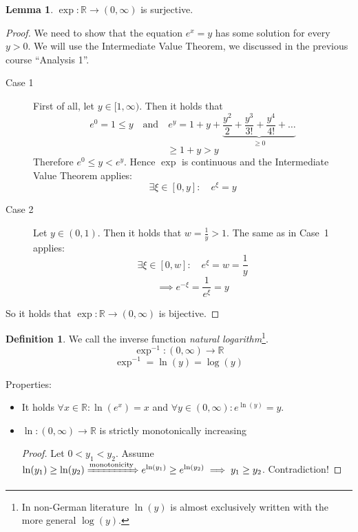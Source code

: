 \documentclass[a4paper,landscape,twocolumn]{article}
\theoremstyle{definition}
\newtheorem{defi}{Definition}
\newtheorem{lemma}{Lemma}
\begin{document}
\begin{lemma}
  $\exp: \mathbb R \to (0,\infty)$
  is surjective.
\end{lemma}
\begin{proof}
  We need to show that the equation $e^x = y$ has some solution for every $y > 0$.
  We will use the Intermediate Value Theorem, we discussed in the previous course \enquote{Analysis 1}.

  \begin{description}
    \item[Case 1]
      First of all, let $y \in [1,\infty)$. Then it holds that
      \[ e^0 = 1 \leq y \quad\text{and}\quad e^y = 1 + y + \underbrace{\frac{y^2}{2} + \frac{y^3}{3!} + \frac{y^4}{4!} + \ldots}_{\geq 0} \]
      \[ \geq 1 + y > y \]
      Therefore $e^0 \leq y < e^y$.
      Hence $\exp$ is continuous and the Intermediate Value Theorem applies:
      \[ \exists \xi \in [0,y]: \quad e^\xi = y \]
    \item[Case 2]
      Let $y \in (0,1)$. Then it holds that $w = \frac1{y} > 1$.
      The same as in Case~1 applies:
      \[ \exists \xi \in [0,w]: \quad e^\xi = w = \frac1{y} \]
      \[ \implies e^{-\xi} = \frac{1}{e^\xi} = y \]
  \end{description}

  So it holds that $\exp: \mathbb R \to (0,\infty)$ is bijective.
\end{proof}

\begin{defi}
  We call the inverse function \emph{natural logarithm}\footnote{In non-German literature $\ln(y)$ is almost exclusively written with the more general $\log(y)$.}.
  \[ \exp^{-1}: (0,\infty) \to \mathbb R \]
  \[ \exp^{-1} = \ln(y) = \log(y) \]

  Properties:
  \begin{itemize}
    \item It holds $\forall x \in \mathbb R: \ln(e^x) = x$ and $\forall y \in (0,\infty): e^{\ln(y)} = y$.
    \item $\ln: (0,\infty) \to \mathbb R$ is strictly monotonically increasing
      \begin{proof}
        Let $0 < y_1 < y_2$. Assume $\ln(y_1) \geq \ln(y_2) \xRightarrow{\text{monotonicity}} e^{\ln(y_1)} \geq e^{\ln(y_2)} \implies y_1 \geq y_2$. Contradiction!
      \end{proof}
  \end{itemize}
\end{defi}
\end{document}
